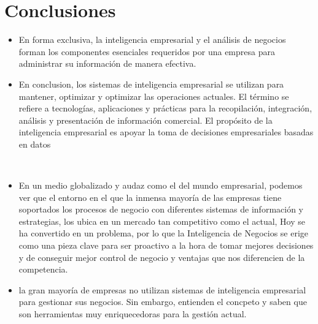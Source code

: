 \documentclass[%
 reprint,
 amsmath,amssymb,
 aps,
]{revtex4-1}
\begin{document}
\section{Conclusiones}
\begin{itemize}
\item En forma exclusiva, la inteligencia empresarial y el análisis de negocios forman los componentes esenciales requeridos por una empresa para administrar su información de manera efectiva.
\\
\item 
En conclusion, los sistemas de inteligencia empresarial se utilizan para mantener, optimizar y optimizar las operaciones actuales. El término se refiere a tecnologías, aplicaciones y prácticas para la recopilación, integración, análisis y presentación de información comercial. El propósito de la inteligencia empresarial es apoyar la toma de decisiones empresariales basadas en datos

\\
\item En un medio globalizado y audaz como el del mundo empresarial, podemos ver que el entorno en el que la inmensa mayoría de las empresas tiene soportados los procesos de negocio con diferentes sistemas de información y estrategias, los ubica en un mercado tan competitivo como el actual, Hoy se ha convertido en un problema, por lo que la Inteligencia de Negocios se erige como una pieza clave para ser proactivo a la hora de tomar mejores decisiones y de conseguir mejor control de negocio y ventajas que nos diferencien de la competencia.
\\
\item la gran mayoría de empresas no utilizan sistemas de inteligencia empresarial para gestionar sus negocios. Sin embargo, entienden el concpeto y saben que son herramientas muy enriquecedoras para la gestión actual.
\end{itemize} 






\end{document}
